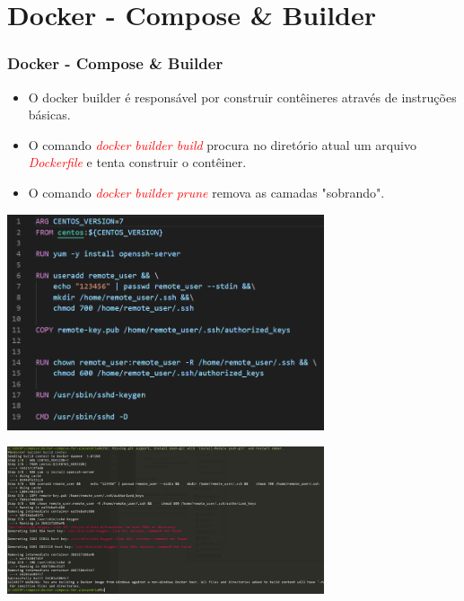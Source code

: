 \documentclass[10pt]{beamer}
\theoremstyle{remark}
\theoremstyle{definition}
\newcommand{\code}[1]{\textcolor{red} {\textit{#1}}} %
\begin{document}
\section{Docker - Compose \& Builder}
\begin{frame}[allowframebreaks]
\frametitle{Docker - Compose \& Builder}

	\begin{itemize}
		\item O docker builder é responsável por construir contêineres através de instruções básicas.
		
		\item O comando \code{docker builder build} procura no diretório atual um arquivo \code{Dockerfile} e tenta construir o contêiner.
		
		\item O comando \code{docker builder prune} remova as camadas "sobrando".
	\end{itemize}
	
	\framebreak
	
	\begin{center}
		\includegraphics[width=0.7\textwidth]{images/21.png}
	\end{center}
	
	\framebreak
	
	\begin{center}
		\includegraphics[width=0.7\textwidth]{images/22.png}
	\end{center}
	

\end{frame}
\end{document}
